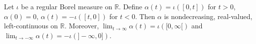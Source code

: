 Let $\iota$ be a regular Borel measure on $\mathbb{R}$. Define $\alpha(t) = \iota([0,t])$ for $t>0$, $\alpha(0)=0$, $\alpha(t)=-\iota([t,0])$ for $t<0$. Then $\alpha$ is nondecreasing, real-valued, left-continuous on $\mathbb{R}$. Moreover, $\lim_{t\to\infty}\alpha(t) = \iota([0,\infty[)$ and $\lim_{t\to-\infty}\alpha(t) = -\iota(]-\infty,0])$.

